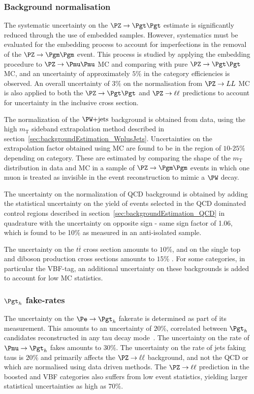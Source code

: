 \subsubsection{\textbf{Background normalisation}}
The systematic uncertainty on the $\ZToTauTau$ estimate is significantly reduced
through the use of embedded samples. However, systematics must be evaluated for
the embedding process to account for imperfections in the removal of the
$\PZ\to\Pgm\Pgm$ event. This process is studied by applying the embedding
procedure to $\PZ\to\Pmu\Pmu$ \ac{MC} and comparing with pure $\ZToTauTau$
\ac{MC}, and an uncertainty of approximately $5\%$ in the category efficiencies
is observed. An overall uncertainty of $3\%$ on the normalisation from
$\PZ\to LL$ \ac{MC} is also applied to both the $\ZToTauTau$ and
$\PZ\to\ell\ell$ predictions to account for uncertainty in the inclusive
cross section.

The normalization of the $\WJets$ background is obtained from data, 
using the high $m_{\text{T}}$ sideband extrapolation method described in
section~\ref{sec:backgroundEstimation_WplusJets}. Uncertainties on the
extrapolation factor obtained using \ac{MC} are found to be in the region of
$10$-$25\%$ depending on category. These are estimated by comparing the shape of
the $m_{\text{T}}$ distribution in data and \ac{MC} in a sample of
$\PZ\to\Pgm\Pgm$ events in which one muon is treated as invisible in the event
reconstruction to mimic a $\PW$ decay. 

The uncertainty on the normalization of QCD background is obtained by adding the
statistical uncertainty on the yield of events selected in the QCD dominated control regions
described in section~\ref{sec:backgroundEstimation_QCD} in quadrature with the
uncertainty on opposite sign - same sign factor of 1.06, which is found to be
10$\%$ as measured in an anti-isolated sample.

The uncertainty on the $t \bar{t}$ cross section amounts to $10\%$, and on the single top and diboson
production cross sections amounts to $15\%$
\cite{Chatrchyan:2013oev,Chatrchyan:2012ep}. For some categories, in particular
the VBF-tag, an additional uncertainty on these backgrounds is added to account
for low \ac{MC} statistics.  
 
\subsubsection{\textbf{$\Pgth$ fake-rates}} 
The uncertainty on the $\Pe \to \Pgth$ fakerate is determined as part of
its measurement. This amounts to an uncertainty of $20\%$, correlated between
$\Pgth$ candidates reconstructed in any tau decay mode~\cite{HIG-13-004}. 
The uncertainty on the rate of $\Pmu \to \Pgth$ fakes amounts to $30\%$.
The uncertainty on the rate of jets faking taus is $20\%$ and primarily affects
the $\PZ\to\ell\ell$ background, and not the QCD or \WJets which are normalised
using data driven methods. The $\PZ\to\ell\ell$ prediction in the boosted and
VBF categories also suffers from low event statistics, yielding larger
statistical uncertainties as high as $70\%$.

